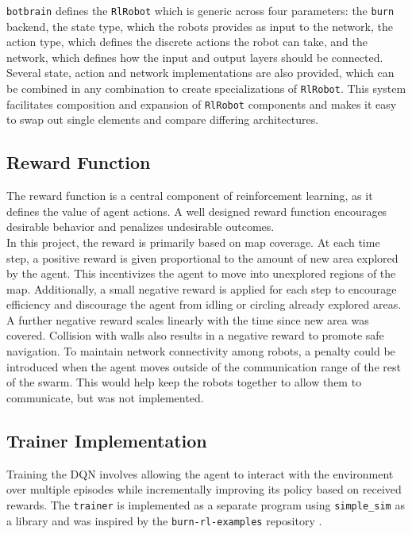 \texttt{botbrain} defines the \texttt{RlRobot} which is generic across four parameters: the \texttt{burn} backend, the state type, which the robots provides as input to the network, the action type, which defines the discrete actions the robot can take, and the network, which defines how the input and output layers should be connected. Several state, action and network implementations are also provided, which can be combined in any combination to create specializations of \texttt{RlRobot}. This system facilitates composition and expansion of \texttt{RlRobot} components and makes it easy to swap out single elements and compare differing architectures.

\subsection{Reward Function}
The reward function is a central component of reinforcement learning, as it defines the value of agent actions. A well designed reward function encourages desirable behavior and penalizes undesirable outcomes. \\

In this project, the reward is primarily based on map coverage. At each time step, a positive reward is given proportional to the amount of new area explored by the agent. This incentivizes the agent to move into unexplored regions of the map. Additionally, a small negative reward is applied for each step to encourage efficiency and discourage the agent from idling or circling already explored areas. A further negative reward scales linearly with the time since new area was covered. Collision with walls also results in a negative reward to promote safe navigation. To maintain network connectivity among robots, a penalty could be introduced when the agent moves outside of the communication range of the rest of the swarm. This would help keep the robots together to allow them to communicate, but was not implemented.

\subsection{Trainer Implementation}
Training the DQN involves allowing the agent to interact with the environment over multiple episodes while incrementally improving its policy based on received rewards. The \texttt{trainer} is implemented as a separate program using \texttt{simple\_sim} as a library and was inspired by the \texttt{burn-rl-examples} repository \cite{burn-rl-examples}. \\

